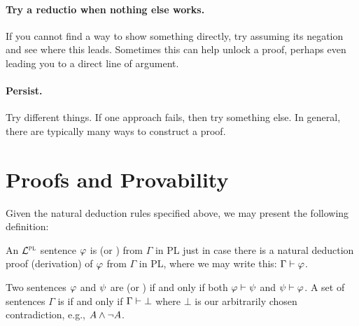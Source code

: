 \paragraph{Try a reductio when nothing else works.}
If you cannot find a way to show something directly, try assuming its negation and see where this leads.
Sometimes this can help unlock a proof, perhaps even leading you to a direct line of argument.

\paragraph{Persist.}
Try different things.
If one approach fails, then try something else.
In general, there are typically many ways to construct a proof.




\section{Proofs and Provability}

Given the natural deduction rules specified above, we may present the following definition:


An $\mathcal{L}^{\textsc{pl}}$ sentence $\varphi$ is  (or ) from $\Gamma$ in PL just in case there is a natural deduction proof (derivation) of $\varphi$ from $\Gamma$ in PL, where we may write this: $\Gamma \vdash \varphi$. 

Two sentences $\varphi$ and $\psi$ are  (or ) if and only if both $\varphi\vdash\psi$ and $\psi\vdash\varphi$.
A set of sentences $\Gamma$ is  if and only if $\Gamma\vdash\bot$ where $\bot$ is our arbitrarily chosen contradiction, e.g., $A\wedge\neg A$.


